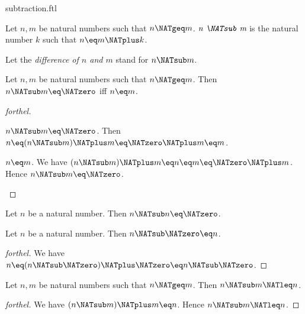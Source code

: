 \documentclass{stex}
\begin{document}
\begin{smodule}{subtraction.ftl}

\begin{definition}[forthel,id=ARITHMETIC_05_8878757276286976]
  Let $n, m$ be natural numbers such that $n \NATgeq m$.
  $\emph{n \NATsub m}$ is the natural number $k$ such that $n \eq m \NATplus k$.

  Let the \emph{difference of $n$ and $m$} stand for $n \NATsub m$.
\end{definition}

\begin{proposition}[forthel,id=ARITHMETIC_05_874271710642176]
  Let $n, m$ be natural numbers such that $n \NATgeq m$.
  Then $n \NATsub m \eq \NATzero$ iff $n \eq m$.
\end{proposition}
\begin{proof}[forthel]
  \begin{case}{$n \NATsub m \eq \NATzero$.}
    Then $n
      \eq (n \NATsub m) \NATplus m
      \eq \NATzero \NATplus m
      \eq m$.
  \end{case}

  \begin{case}{$n \eq m$.}
    We have $(n \NATsub m) \NATplus m
      \eq n
      \eq m
      \eq \NATzero \NATplus m$.
    Hence $n \NATsub m \eq \NATzero$.
  \end{case}
\end{proof}

\begin{corollary}[forthel,id=ARITHMETIC_05_8457713057005568]
  Let $n$ be a natural number.
  Then $n \NATsub n \eq \NATzero$.
\end{corollary}

\begin{proposition}[forthel,id=ARITHMETIC_05_8518521570983936]
  Let $n$ be a natural number.
  Then $n \NATsub \NATzero \eq n$.
\end{proposition}
\begin{proof}[forthel]
  We have $n
    \eq (n \NATsub \NATzero) \NATplus \NATzero
    \eq n \NATsub \NATzero$.
\end{proof}

\begin{proposition}[forthel,id=ARITHMETIC_05_4222566117933056]
  Let $n, m$ be natural numbers such that $n \NATgeq m$.
  Then $n \NATsub m \NATleq n$.
\end{proposition}
\begin{proof}[forthel]
  We have $(n \NATsub m) \NATplus m \eq n$.
  Hence $n \NATsub m \NATleq n$.
\end{proof}


\end{smodule}
\end{document}
